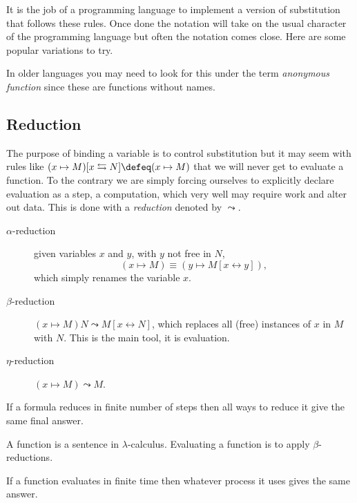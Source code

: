 It is the job of a programming language to implement a version 
of substitution that follows these rules.  Once done the notation will take 
on the usual character of the programming language but often the notation 
comes close.  Here are some popular variations to try.
\begin{center}
\end{center} 
In older languages you may need to look for this under the term \emph{anonymous function}
since these are functions without names.

\subsection{Reduction}
The purpose of binding a variable is to control substitution but it may seem 
with rules like $(x\mapsto M)[x\leftrightarrows N]\defeq (x\mapsto M)$ that 
we will never get to evaluate a function.  To the contrary we are simply forcing 
ourselves to explicitly declare evaluation as a step, a computation, which 
very well may require work and alter out data.  This is done with a \emph{reduction}
denoted by $\leadsto$.
\begin{description}
    \item[$\alpha$-reduction] given variables $x$ and $y$, with $y$ not free in $N$,
    \[(x\mapsto M)\equiv (y\mapsto M[x\leftrightarrow y]),\]
    which simply renames the variable $x$.

    \item[$\beta$-reduction]
    $(x\mapsto M)N\leadsto M[x\leftrightarrow N]$, which replaces all (free)
    instances of $x$ in $M$ with $N$.  This is the main tool, it is evaluation.
    
    \item[$\eta$-reduction]
    $(x\mapsto M)\leadsto M$.
\end{description}

\begin{theorem}
    If a formula reduces in finite number of steps then all ways to reduce it give the same 
    final answer.
\end{theorem}


\begin{definition}
    A function is a sentence in $\lambda$-calculus.
    Evaluating a function is to apply $\beta$-reductions.
\end{definition}

\begin{corollary}
    If a function evaluates in finite time then whatever process it uses 
    gives the same answer.
\end{corollary}

